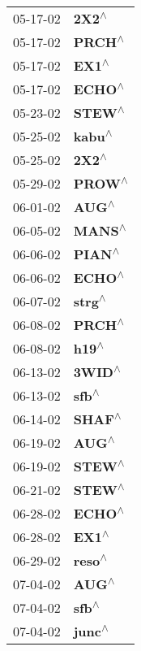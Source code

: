 \begin{supertabular}{p{0.08\textwidth}p{0.2\textwidth}}
 05-17-02 &     \textbf{2X2\textsuperscript{$\wedge$}} \\
 05-17-02 &    \textbf{PRCH\textsuperscript{$\wedge$}} \\
 05-17-02 &     \textbf{EX1\textsuperscript{$\wedge$}} \\
 05-17-02 &    \textbf{ECHO\textsuperscript{$\wedge$}} \\
 05-23-02 &    \textbf{STEW\textsuperscript{$\wedge$}} \\
 05-25-02 &    \textbf{kabu\textsuperscript{$\wedge$}} \\
 05-25-02 &     \textbf{2X2\textsuperscript{$\wedge$}} \\
 05-29-02 &    \textbf{PROW\textsuperscript{$\wedge$}} \\
 06-01-02 &     \textbf{AUG\textsuperscript{$\wedge$}} \\
 06-05-02 &    \textbf{MANS\textsuperscript{$\wedge$}} \\
 06-06-02 &    \textbf{PIAN\textsuperscript{$\wedge$}} \\
 06-06-02 &    \textbf{ECHO\textsuperscript{$\wedge$}} \\
 06-07-02 &    \textbf{strg\textsuperscript{$\wedge$}} \\
 06-08-02 &    \textbf{PRCH\textsuperscript{$\wedge$}} \\
 06-08-02 &     \textbf{h19\textsuperscript{$\wedge$}} \\
 06-13-02 &    \textbf{3WID\textsuperscript{$\wedge$}} \\
 06-13-02 &     \textbf{sfb\textsuperscript{$\wedge$}} \\
 06-14-02 &    \textbf{SHAF\textsuperscript{$\wedge$}} \\
 06-19-02 &     \textbf{AUG\textsuperscript{$\wedge$}} \\
 06-19-02 &    \textbf{STEW\textsuperscript{$\wedge$}} \\
 06-21-02 &    \textbf{STEW\textsuperscript{$\wedge$}} \\
 06-28-02 &    \textbf{ECHO\textsuperscript{$\wedge$}} \\
 06-28-02 &     \textbf{EX1\textsuperscript{$\wedge$}} \\
 06-29-02 &    \textbf{reso\textsuperscript{$\wedge$}} \\
 07-04-02 &     \textbf{AUG\textsuperscript{$\wedge$}} \\
 07-04-02 &     \textbf{sfb\textsuperscript{$\wedge$}} \\
 07-04-02 &    \textbf{junc\textsuperscript{$\wedge$}} \\

\end{supertabular}
